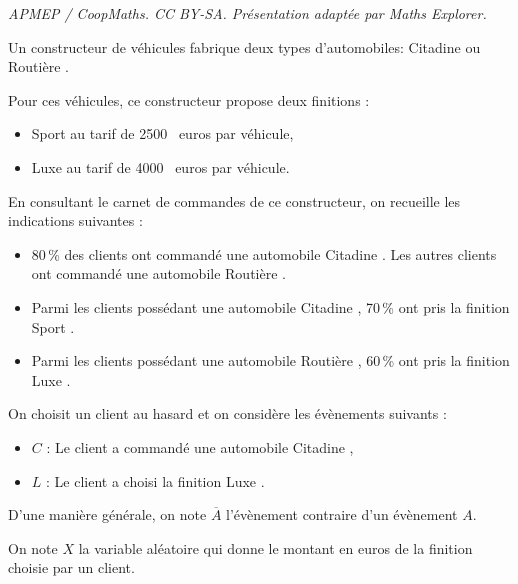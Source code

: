 \documentclass[10pt]{article}
\providecommand{\np}[2][]{{#2~#1}}
\begin{document}
\noindent\textit{APMEP / CoopMaths. CC BY-SA. Présentation adaptée par Maths Explorer.}\par\medskip
\medskip

Un constructeur de véhicules fabrique deux types d'automobiles: \og Citadine\fg{} ou \og Routière \fg.

Pour ces véhicules, ce constructeur propose deux finitions :

\begin{itemize}
\item \og Sport\fg{} au tarif de \np{2500} euros par véhicule, 
\item \og Luxe\fg{} au tarif de \np{4000} euros par véhicule.
\end{itemize}

En consultant le carnet de commandes de ce constructeur, on recueille les indications suivantes :

\setlength\parindent{9mm}
\begin{itemize}
\item[$\bullet~~$] 80\,\% des clients ont commandé une automobile \og Citadine \fg. Les autres clients ont commandé une automobile \og Routière \fg.
\item[$\bullet~~$] Parmi les clients possédant une automobile \og Citadine \fg, 70\,\% ont pris la finition \og Sport \fg.
\item[$\bullet~~$] Parmi les clients possédant une automobile \og Routière \fg, 60\,\% ont pris la finition \og Luxe \fg.
\end{itemize}
\setlength\parindent{0mm}

On choisit un client au hasard et on considère les évènements suivants : 

\setlength\parindent{9mm}
\begin{itemize}
\item[$\bullet~~$] $C$ : \og Le client a commandé une automobile \og Citadine\fg{} \fg,
\item[$\bullet~~$] $L$ : \og Le client a choisi la finition \og Luxe\fg{} \fg.
\end{itemize}
\setlength\parindent{0mm}

D'une manière générale, on note $\overline{A}$ l'évènement contraire d'un évènement $A$.

On note $X$ la variable aléatoire qui donne le montant en euros de la finition choisie par un client.

\medskip
\end{document}
